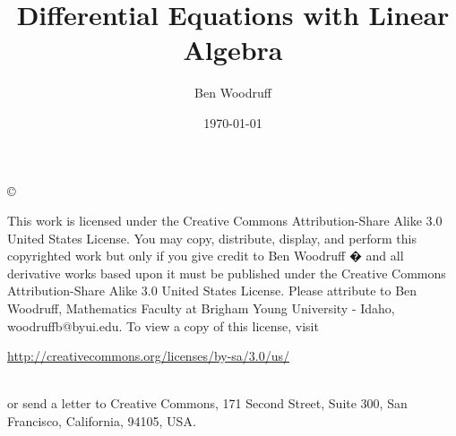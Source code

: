 \documentclass[letterpaper,oneside]{book}%
\theoremstyle{plain}
\theoremstyle{box}
\begin{document}
\frontmatter
\title{Differential Equations with Linear Algebra}
\author{Ben Woodruff}
\date{\today}
\maketitle
\copyright{This work is licensed under the Creative Commons Attribution-Share Alike 3.0 United States License.  You may copy, distribute, display, and perform this copyrighted work but only if you give credit to Ben Woodruff � and all derivative works based upon it must be published under the Creative Commons Attribution-Share Alike 3.0 United States License. Please attribute to Ben Woodruff, Mathematics Faculty at Brigham Young University - Idaho, woodruffb@byui.edu.  To view a copy of this license, visit\\ \centerline{\url{http://creativecommons.org/licenses/by-sa/3.0/us/}} \\ or send a letter to Creative Commons, 171 Second Street, Suite 300, San Francisco, California, 94105, USA.}
\tableofcontents

%

%

\end{document}
